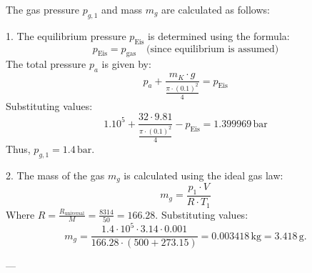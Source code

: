The gas pressure \( p_{g,1} \) and mass \( m_g \) are calculated as follows:  

1. The equilibrium pressure \( p_{\text{Eis}} \) is determined using the formula:  
\[
p_{\text{Eis}} = p_{\text{gas}} \quad \text{(since equilibrium is assumed)}  
\]  
The total pressure \( p_a \) is given by:  
\[
p_a + \frac{m_K \cdot g}{\frac{\pi \cdot (0.1)^2}{4}} = p_{\text{Eis}}
\]  
Substituting values:  
\[
1.10^5 + \frac{32 \cdot 9.81}{\frac{\pi \cdot (0.1)^2}{4}} - p_{\text{Eis}} = 1.399969 \, \text{bar}
\]  
Thus, \( p_{g,1} = 1.4 \, \text{bar} \).  

2. The mass of the gas \( m_g \) is calculated using the ideal gas law:  
\[
m_g = \frac{p_1 \cdot V}{R \cdot T_1}
\]  
Where \( R = \frac{R_{\text{universal}}}{M} = \frac{8314}{50} = 166.28 \).  
Substituting values:  
\[
m_g = \frac{1.4 \cdot 10^5 \cdot 3.14 \cdot 0.001}{166.28 \cdot (500 + 273.15)} = 0.003418 \, \text{kg} = 3.418 \, \text{g}.
\]  

---